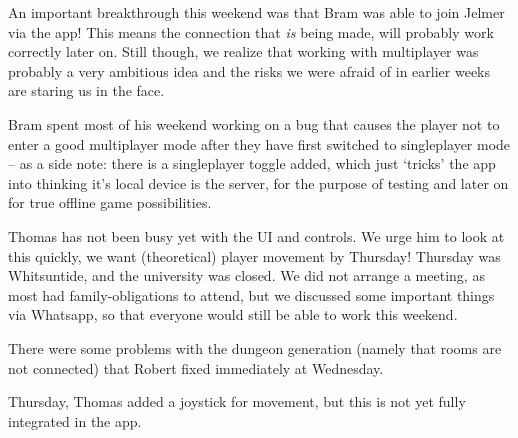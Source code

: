\documentclass[../main.tex]{subfiles}
\begin{document}
An important breakthrough this weekend was that Bram was able to join Jelmer via the app! This means the connection that \textit{is} being made, will probably work correctly later on. Still though, we realize that working with multiplayer was probably a very ambitious idea and the risks we were afraid of in earlier weeks are staring us in the face.

Bram spent most of his weekend working on a bug that causes the player not to enter a good multiplayer mode after they have first switched to singleplayer mode -- as a side note: there is a singleplayer toggle added, which just `tricks' the app into thinking it's local device is the server, for the purpose of testing and later on for true offline game possibilities.

Thomas has not been busy yet with the UI and controls. We urge him to look at this quickly, we want (theoretical) player movement by Thursday!
\bigbreak\noindent
Thursday was Whitsuntide, and the university was closed. We did not arrange a meeting, as most had family-obligations to attend, but we discussed some important things via Whatsapp, so that everyone would still be able to work this weekend.

There were some problems with the dungeon generation (namely that rooms are not connected) that Robert fixed immediately at Wednesday.

Thursday, Thomas added a joystick for movement, but this is not yet fully integrated in the app.
\end{document}
